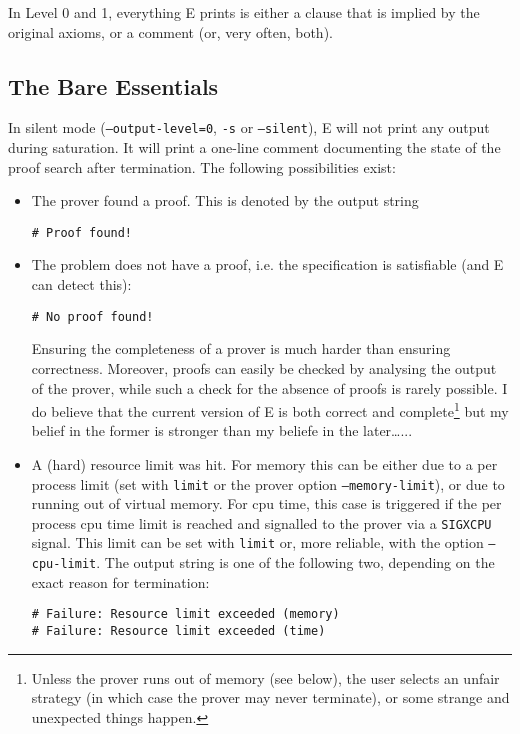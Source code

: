 \documentclass{article}
\begin{document}
In Level 0 and 1, everything E prints is either a clause that is
implied by the original axioms, or a comment (or, very often, both).


\subsection{The Bare Essentials}
\label{sec:output:essentials}

In silent mode (\texttt{--output-level=0}, \texttt{-s} or
\texttt{--silent}), E will not print any output during saturation. It
will print a one-line comment documenting the state of the proof
search after termination. The following possibilities exist:

\begin{itemize}
\item The prover found a proof. This is denoted by the output string
\begin{verbatim}
# Proof found!
\end{verbatim}
\item The problem does not have a proof, i.e. the specification is
  satisfiable (and E can detect this):
\begin{verbatim}
# No proof found!
\end{verbatim}
  Ensuring the completeness of a prover is much harder than ensuring
  correctness. Moreover, proofs can easily be checked by analysing the
  output of the prover, while such a check for the absence of proofs
  is rarely possible. I do believe that the current version of E is
  both correct and complete\footnote{Unless the prover runs out of
    memory (see below), the user selects an unfair strategy (in which
    case the prover may never terminate), or some strange and
    unexpected things happen.} but my belief in the former is stronger
  than my beliefe in the later\ldots...
\item A (hard) resource limit was hit. For memory this can be either
  due to a per process limit (set with \texttt{limit} or the prover
  option \texttt{--memory-limit}), or due to running out of virtual
  memory. For cpu time, this case is triggered if the per process cpu
  time limit is reached and signalled to the prover via a
  \texttt{SIGXCPU} signal. This limit can be set with \texttt{limit}
  or, more reliable, with the option \texttt{--cpu-limit}. The output
  string is one of the following two, depending on the exact reason
  for termination:
\begin{verbatim}
# Failure: Resource limit exceeded (memory)
# Failure: Resource limit exceeded (time)

\end{verbatim}
\end{itemize}
\end{document}
